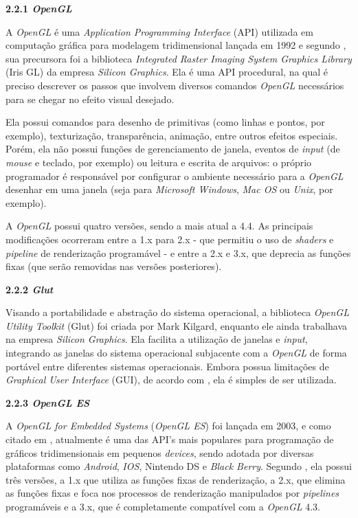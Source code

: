 \begin{description}

	\item \textbf{2.2.1 \textit{OpenGL}}


	A \textit{OpenGL} é uma \textit{Application Programming Interface} (API) utilizada em computação gráfica para modelagem tridimensional lançada em 1992 e segundo  \cite{opengl2011}, sua precursora foi a biblioteca \textit{Integrated Raster Imaging System Graphics Library} (Iris GL) da empresa \textit{Silicon Graphics}. Ela é uma API procedural, na qual é preciso descrever os passos que involvem diversos comandos \textit{OpenGL} necessários para se chegar no efeito visual desejado. 

	Ela possui comandos para desenho de primitivas (como linhas e pontos, por exemplo), texturização, transparência, animação,  entre outros efeitos especiais.  Porém, ela não possui funções de gerenciamento de janela, eventos de \textit{input} (de \textit{mouse} e teclado, por exemplo) ou leitura e escrita de arquivos: o próprio programador é responsável por configurar o ambiente necessário para a \textit{OpenGL} desenhar em uma janela (seja para \textit{Microsoft Windows}, \textit{Mac OS} ou \textit{Unix}, por exemplo). 

	A \textit{OpenGL} possui quatro versões, sendo a mais atual a 4.4. As principais modificações ocorreram entre a 1.x para 2.x - que permitiu o uso de \textit{shaders} e \textit{pipeline} de renderização programável - e entre a 2.x e 3.x, que deprecia as funções fixas (que serão removidas nas versões posteriores). 
 
	\item \textbf{2.2.2 \textit{Glut}}

	Visando a portabilidade e abstração do sistema operacional, a biblioteca \textit{OpenGL Utility Toolkit} (Glut) foi criada por Mark Kilgard, enquanto ele ainda trabalhava na empresa \textit{Silicon Graphics}. Ela facilita a utilização de janelas e \textit{input}, integrando as janelas do sistema operacional subjacente com a  \textit{OpenGL} de forma portável entre diferentes sistemas operacionais. Embora possua limitações de \textit{Graphical User Interface} (GUI), de acordo com  \cite{opengl2011}, ela é simples de ser utilizada. 

	\item \textbf{2.2.3 \textit{OpenGL ES}}
	
	A \textit{OpenGL for Embedded Systems} (\textit{OpenGL ES}) foi lançada em 2003, e como citado em \cite{guha2011}, atualmente é uma das API's mais populares para programação de gráficos tridimensionais em pequenos \textit{devices}, sendo adotada por diversas plataformas como \textit{Android}, \textit{IOS}, Nintendo DS e \textit{Black Berry}. Segundo \cite{opengles2012}, ela possui três versões, a 1.x que utiliza as funções fixas de renderização, a 2.x, que elimina as funções fixas e foca nos processos de renderização manipulados por \textit{pipelines} programáveis e a 3.x, que é completamente compatível com a  \textit{OpenGL} 4.3.  


\end{description}

